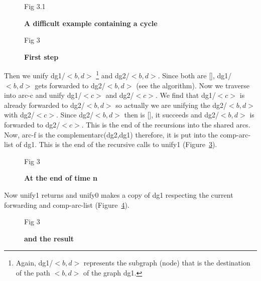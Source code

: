\begin{figure}[htb]
\epsfxsize 140mm
\epsfysize 200mm
\vspace*{2cm}
\hspace*{5cm}
\vspace*{1.5cm}
\hspace*{8cm} Fig 3.1
\vspace*{2cm}
\caption{{\bf A difficult example containing a cycle}}
\label{figure10}
\end{figure}
\begin{figure}[hbt]
\epsfxsize 140mm
\epsfysize 200mm
\vspace*{1.5cm}
\hspace*{5cm}
\vspace*{1.5cm}
\hspace*{8cm} Fig 3
\vspace*{2cm}
\caption{{\bf First step}}
\label{figure11}
\end{figure}

 Then we unify dg1/$<b,d>$ \footnote{Again, dg1/$<b,d>$ represents the
subgraph (node) that is the destination of the path $<b,d>$ of the
graph dg1.} and dg2/$<b,d>$. Since both are [],
dg1/$<b,d>$ gets forwarded to dg2/$<b,d>$ (see the algorithm). Now we
traverse into arc-c and unify dg1/$<c>$  and dg2/$<c>$. We find that
dg1/$<c>$ is already forwarded to dg2/$<b,d>$ so actually we are unifying
the dg2/$<b,d>$ with dg2/$<c>$. Since dg2/$<b,d>$ then is [], it succeeds and
dg2/$<b,d>$ is forwarded to dg2/$<c>$. This is the end of the recursions
into the shared arcs. Now, arc-f is the complementarc(dg2,dg1)
therefore, it is put into the comp-arc-list of dg1.  This is the end
of the recursive calls to unify1 (Figure~\ref{figure12}).


\begin{figure}[htb]
\epsfxsize 140mm
\epsfysize 200mm
\vspace*{2.5cm}
\hspace*{5cm}
\vspace*{2cm}
\vspace*{-19cm}
\hspace*{8cm} Fig 3
\caption{{\bf At the end of time n}}
\label{figure12}
\end{figure}
Now unify1 returns and unify0 makes a copy of dg1 respecting the
current forwarding and comp-arc-list (Figure~\ref{figure13}).
\begin{figure}[htb]
\epsfxsize 140mm
\epsfysize 100mm
\vspace*{2.0cm}
\hspace*{5cm}
\vspace*{1.5cm}
\hspace*{8cm} Fig 3
\vspace*{2cm}
\caption{{\bf and the result}}
\label{figure13}
\end{figure}

